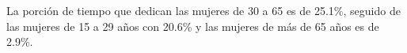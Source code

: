 La porción de tiempo que dedican las mujeres de 30 a 65 es de 25.1\%, seguido de las mujeres de 15 a 29 años con 20.6\% y las mujeres de más de 65 años es de 2.9\%.